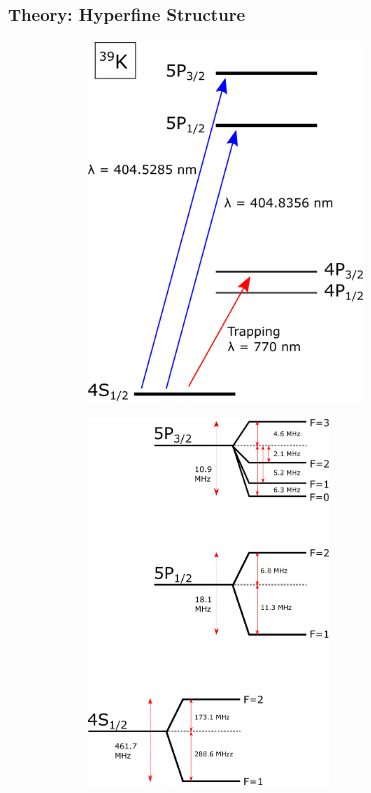 \documentclass{beamer}
\theoremstyle{definition}
\begin{document}
\begin{frame}
\frametitle{Theory: Hyperfine Structure}


\begin{figure}[!htb]
	\centering
	\hspace{10 pt}
	\begin{subfigure}{0.49\textwidth}
		\includegraphics[width=0.8\textwidth]{energy_levels.png}
	\end{subfigure}
	\hspace{-20 pt}
	\begin{subfigure}{0.49\textwidth}
		\includegraphics[width=0.7\textwidth]{hyperfine.png}
	\end{subfigure}
\end{figure}



\end{frame}
\end{document}
